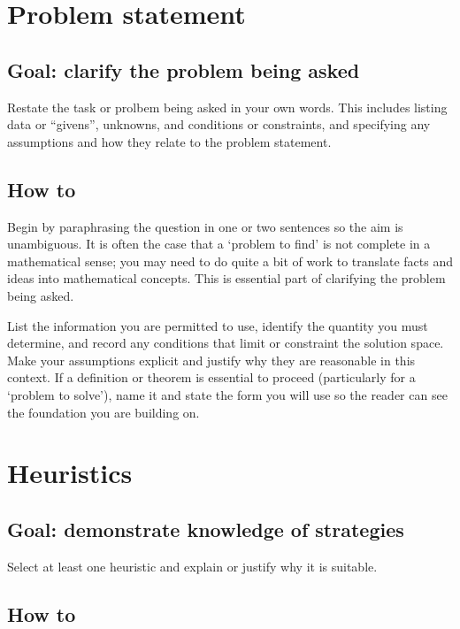 \documentclass[
  a4paper,
  DIV=11,
  numbers=noendperiod,
  oneside]{scrreprt}
\begin{document}
\section{Problem statement}\label{problem-statement}

\subsection{Goal: clarify the problem being
asked}\label{goal-clarify-the-problem-being-asked}

Restate the task or prolbem being asked in your own words. This includes
listing data or ``givens'', unknowns, and conditions or constraints, and
specifying any assumptions and how they relate to the problem statement.

\subsection{How to}\label{how-to}

Begin by paraphrasing the question in one or two sentences so the aim is
unambiguous. It is often the case that a `problem to find' is not
complete in a mathematical sense; you may need to do quite a bit of work
to translate facts and ideas into mathematical concepts. This is
essential part of clarifying the problem being asked.

List the information you are permitted to use, identify the quantity you
must determine, and record any conditions that limit or constraint the
solution space. Make your assumptions explicit and justify why they are
reasonable in this context. If a definition or theorem is essential to
proceed (particularly for a `problem to solve'), name it and state the
form you will use so the reader can see the foundation you are building
on.

\section{Heuristics}\label{heuristics}

\subsection{Goal: demonstrate knowledge of
strategies}\label{goal-demonstrate-knowledge-of-strategies}

Select at least one heuristic and explain or justify why it is suitable.

\subsection{How to}\label{how-to-1}
\end{document}
